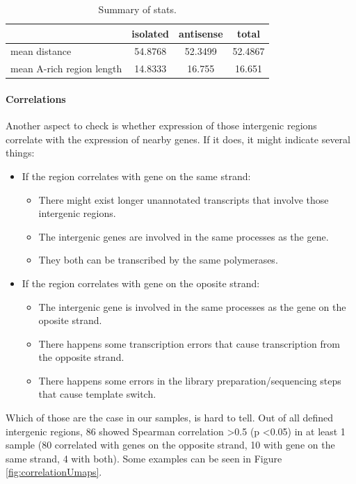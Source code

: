 \begin{table}[htbp]
  \centering
  \begin{tabular}{l|ccc}
    \toprule
     & isolated & antisense & total  \\
    \midrule
    mean distance & 54.8768 & 52.3499 & 52.4867 \\
    mean A-rich region length & 14.8333 & 16.755 & 16.651 \\
    \bottomrule
  \end{tabular}
  \caption{Summary of stats.}
  \label{tab:polyAstats}
\end{table}


\paragraph{Correlations}

Another aspect to check is whether expression of those intergenic regions correlate with the expression of nearby genes.
If it does, it might indicate several things:
\begin{itemize}
  \item If the region correlates with gene on the same strand:
  \begin{itemize}
    \item There might exist longer unannotated transcripts that involve those intergenic regions.
    \item The intergenic genes are involved in the same processes as the gene.
    \item They both can be transcribed by the same polymerases.
  \end{itemize}
  \item If the region correlates with gene on the oposite strand:
  \begin{itemize}
    \item The intergenic gene is involved in the same processes as the gene on the oposite strand.
    \item There happens some transcription errors that cause transcription from the opposite strand.
    \item There happens some errors in the library preparation/sequencing steps that cause template switch.
  \end{itemize}
\end{itemize}

Which of those are the case in our samples, is hard to tell.
Out of all defined intergenic regions, 86 showed Spearman correlation \textgreater 0.5 (p \textless 0.05) in at least 1 sample
(80 correlated with genes on the opposite strand, 10 with gene on the same strand, 4 with both).
Some examples can be seen in Figure \ref{fig:correlationUmaps}.

